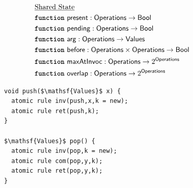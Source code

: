 \begin{figure} [t]
\vspace{-2mm}
\begin{minipage}[t]{7.5cm}
\scriptsize{
{	%
	\begin{align*}
		& \text{\underline{Shared State}} \\
		& \text{{\ttfamily \bfseries function}}\ \mathsf{present} : \mathsf{Operations} \rightarrow \mathsf{Bool} \\
		& \text{{\ttfamily \bfseries function}}\ \mathsf{pending} : \mathsf{Operations} \rightarrow \mathsf{Bool} \\
		& \text{{\ttfamily \bfseries function}}\ \mathsf{arg} : \mathsf{Operations} \rightarrow \mathsf{Values} \\
		& \text{{\ttfamily \bfseries function}}\ \mathsf{before} : \mathsf{Operations} \times \mathsf{Operations} \rightarrow \mathsf{Bool} \\
		& \text{{\ttfamily \bfseries function}}\ \mathsf{maxAtInvoc} : \mathsf{Operations} \rightarrow 2^\mathsf{Operations} \\
		& \text{{\ttfamily \bfseries function}}\ \mathsf{overlap} : \mathsf{Operations} \rightarrow 2^\mathsf{Operations} \\
	\end{align*}
}}
\end{minipage}
\begin{minipage}[t]{7.5cm}
\begin{lstlisting}
void push($\mathsf{Values}$ x) {
  atomic rule inv(push,x,k = new);
  atomic rule ret(push,k);
}

$\mathsf{Values}$ pop() {
  atomic rule inv(pop,k = new);
  atomic rule com(pop,y,k);
  atomic rule ret(pop,y,k);
}
\end{lstlisting}
\end{minipage}


\end{figure}
